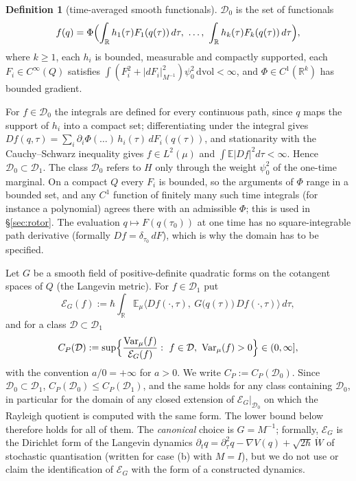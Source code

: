 \documentclass[11pt,a4paper]{article}
\theoremstyle{definition}
\newtheorem{definition}[theorem]{Definition}
\theoremstyle{remark}
\newcommand{\E}{\mathbb{E}}
\newcommand{\R}{\mathbb{R}}
\newcommand{\Var}{\operatorname{Var}}
\newcommand{\cE}{\mathcal{E}}
\newcommand{\cD}{\mathcal{D}}
\newcommand{\dvol}{\,\mathrm{dvol}}
\begin{document}
\begin{definition}[time-averaged smooth functionals]\label{def:D0}
$\cD_0$ is the set of functionals
\[
  f(q)=\Phi\Bigl(\int_\R h_1(\tau)F_1(q(\tau))\,d\tau,\ \dots,\ \int_\R h_k(\tau)F_k(q(\tau))\,d\tau\Bigr),
\]
where $k\ge1$, each $h_i$ is bounded, measurable and compactly supported, each $F_i\in C^\infty(Q)$ satisfies $\int(F_i^2+|dF_i|^2_{M^{-1}})\psi_0^2\dvol<\infty$, and $\Phi\in C^1(\R^k)$ has bounded gradient.
\end{definition}

For $f\in\cD_0$ the integrals are defined for every continuous path, since $q$ maps the support of $h_i$ into a compact set; differentiating under the integral gives $Df(q,\tau)=\sum_i\partial_i\Phi(\dots)\,h_i(\tau)\,dF_i(q(\tau))$, and stationarity with the Cauchy--Schwarz inequality gives $f\in L^2(\mu)$ and $\int\E|Df|^2d\tau<\infty$.
Hence $\cD_0\subset\cD_1$.
The class $\cD_0$ refers to $H$ only through the weight $\psi_0^2$ of the one-time marginal.
On a compact $Q$ every $F_i$ is bounded, so the arguments of $\Phi$ range in a bounded set, and any $C^1$ function of finitely many such time integrals (for instance a polynomial) agrees there with an admissible $\Phi$; this is used in \S\ref{sec:rotor}.
The evaluation $q\mapsto F(q(\tau_0))$ at one time has no square-integrable path derivative (formally $Df=\delta_{\tau_0}\,dF$), which is why the domain has to be specified.

Let $G$ be a smooth field of positive-definite quadratic forms on the cotangent spaces of $Q$ (the Langevin metric).
For $f\in\cD_1$ put
\[
  \cE_G(f):=\hbar\int_\R\E_\mu\bigl\langle Df(\cdot,\tau),\ G\bigl(q(\tau)\bigr)\,Df(\cdot,\tau)\bigr\rangle\,d\tau ,
\]
and for a class $\cD\subset\cD_1$
\[
  C_P(\cD):=\sup\Bigl\{\frac{\Var_\mu(f)}{\cE_G(f)}:\ f\in\cD,\ \Var_\mu(f)>0\Bigr\}\in(0,\infty],
\]
with the convention $a/0=+\infty$ for $a>0$.
We write $C_P:=C_P(\cD_0)$.
Since $\cD_0\subset\cD_1$, $C_P(\cD_0)\le C_P(\cD_1)$, and the same holds for any class containing $\cD_0$, in particular for the domain of any closed extension of $\cE_G|_{\cD_0}$ on which the Rayleigh quotient is computed with the same form.
The lower bound below therefore holds for all of them.
The \emph{canonical} choice is $G=M^{-1}$; formally, $\cE_G$ is the Dirichlet form of the Langevin dynamics $\partial_t q=\partial_\tau^2 q-\nabla V(q)+\sqrt{2\hbar}\,\dot W$ of stochastic quantisation (written for case (b) with $M=I$), but we do not use or claim the identification of $\cE_G$ with the form of a constructed dynamics.
\end{document}
